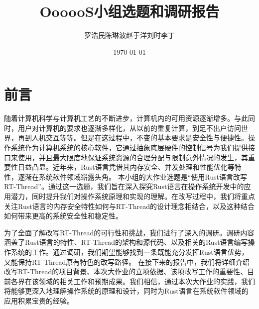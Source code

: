 \documentclass{ctexart}
\title{OooooS小组选题和调研报告}
\author{罗浩民\;陈琳波\;赵于洋\;刘时\;李丁}
\date{\today}
\begin{document}
\maketitle

\section{前言}
随着计算机科学与计算机工艺的不断进步，计算机内的可用资源逐渐增多。与此同时，用户对计算机的要求也逐渐多样化，从以前的重复计算，到足不出户访问世界，再到人机交互等等。但是在这过程中，不变的基本要求是安全性与便捷性。操作系统作为计算机系统的核心软件，它通过抽象底层硬件的控制信号为我们提供接口来使用，并且最大限度地保证系统资源的合理分配与限制意外情况的发生，其重要性日益凸显。近年来，Rust语言凭借其内存安全、并发处理和性能优化等特性，逐渐在系统软件领域崭露头角。
本小组的大作业选题是“使用Rust语言改写RT-Thread”。通过这一选题，我们旨在深入探究Rust语言在操作系统开发中的应用潜力，同时提升我们对操作系统原理和实现的理解。在改写过程中，我们将重点关注Rust语言的内存安全特性如何与RT-Thread的设计理念相结合，以及这种结合如何带来更高的系统安全性和稳定性。

为了全面了解改写RT-Thread的可行性和挑战，我们进行了深入的调研。调研内容涵盖了Rust语言的特性、RT-Thread的架构和源代码、以及相关的Rust语言编写操作系统的工作。通过调研，我们期望能够找到一条既能充分发挥Rust语言优势，又能保持RT-Thread原有特色的改写路径。
\cite{yi2020design}
在接下来的报告中，我们将详细介绍改写RT-Thread的项目背景、本次大作业的立项依据、该项改写工作的重要性、目前各界在该领域的相关工作和预期成果。我们相信，通过本次大作业的实践，我们将能够更深入地理解操作系统的原理和设计，同时为Rust语言在系统软件领域的应用积累宝贵的经验。
\newpage
\tableofcontents
\newpage







\end{document}
